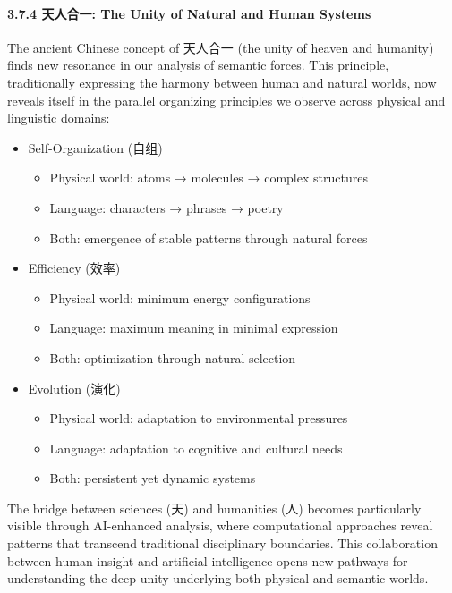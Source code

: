 \documentclass[
]{article}
\providecommand{\tightlist}{%
  \setlength{\itemsep}{0pt}\setlength{\parskip}{0pt}}
\begin{document}
\paragraph{3.7.4 天人合一: The Unity of Natural and Human
Systems}\label{ux5929ux4ebaux5408ux4e00-the-unity-of-natural-and-human-systems}

The ancient Chinese concept of 天人合一 (the unity of heaven and
humanity) finds new resonance in our analysis of semantic forces. This
principle, traditionally expressing the harmony between human and
natural worlds, now reveals itself in the parallel organizing principles
we observe across physical and linguistic domains:

\begin{itemize}
\tightlist
\item
  Self-Organization (自组)

  \begin{itemize}
  \tightlist
  \item
    Physical world: atoms → molecules → complex structures
  \item
    Language: characters → phrases → poetry
  \item
    Both: emergence of stable patterns through natural forces
  \end{itemize}
\item
  Efficiency (效率)

  \begin{itemize}
  \tightlist
  \item
    Physical world: minimum energy configurations
  \item
    Language: maximum meaning in minimal expression
  \item
    Both: optimization through natural selection
  \end{itemize}
\item
  Evolution (演化)

  \begin{itemize}
  \tightlist
  \item
    Physical world: adaptation to environmental pressures
  \item
    Language: adaptation to cognitive and cultural needs
  \item
    Both: persistent yet dynamic systems
  \end{itemize}
\end{itemize}

The bridge between sciences (天) and humanities (人) becomes
particularly visible through AI-enhanced analysis, where computational
approaches reveal patterns that transcend traditional disciplinary
boundaries. This collaboration between human insight and artificial
intelligence opens new pathways for understanding the deep unity
underlying both physical and semantic worlds.
\end{document}
